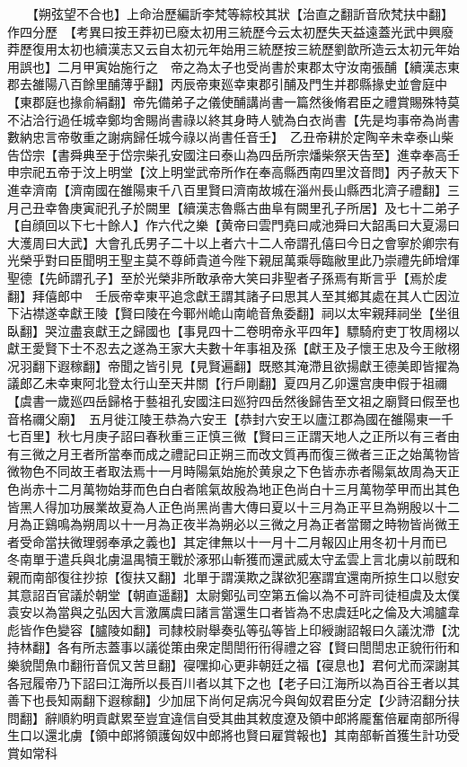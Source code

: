 　　【朔弦望不合也】上命治歷編訢李梵等綜校其狀【治直之翻訢音欣梵扶中翻】作四分歷　【考異曰按王莽初已廢太初用三統歷今云太初歷失天益遠蓋光武中興廢莽歷復用太初也續漢志又云自太初元年始用三統歷按三統歷劉歆所造云太初元年始用誤也】二月甲寅始施行之　帝之為太子也受尚書於東郡太守汝南張酺【續漢志東郡去雒陽八百餘里酺薄乎翻】丙辰帝東廵幸東郡引酺及門生并郡縣掾史並會庭中【東郡庭也掾俞絹翻】帝先備弟子之儀使酺講尚書一篇然後脩君臣之禮賞賜殊特莫不沾洽行過任城幸鄭均舍賜尚書祿以終其身時人號為白衣尚書【先是均事帝為尚書數納忠言帝敬重之謝病歸任城今祿以尚書任音壬】　乙丑帝耕於定陶辛未幸泰山柴告岱宗【書舜典至于岱宗柴孔安國注曰泰山為四岳所宗燔柴祭天告至】進幸奉高壬申宗祀五帝于汶上明堂【汶上明堂武帝所作在奉高縣西南四里汶音問】丙子赦天下進幸濟南【濟南國在雒陽東千八百里賢曰濟南故城在淄州長山縣西北濟子禮翻】三月己丑幸魯庚寅祀孔子於闕里【續漢志魯縣古曲阜有闕里孔子所居】及七十二弟子【自顔回以下七十餘人】作六代之樂【黄帝曰雲門堯曰咸池舜曰大韶禹曰大夏湯曰大濩周曰大武】大會孔氏男子二十以上者六十二人帝謂孔僖曰今日之會寧於卿宗有光榮乎對曰臣聞明王聖主莫不尊師貴道今陛下親屈萬乘辱臨敝里此乃崇禮先師增煇聖德【先師謂孔子】至於光榮非所敢承帝大笑曰非聖者子孫焉有斯言乎【焉於䖍翻】拜僖郎中　壬辰帝幸東平追念獻王謂其諸子曰思其人至其鄉其處在其人亡因泣下沾襟遂幸獻王陵【賢曰陵在今鄆州峗山南峗音魚委翻】祠以太牢親拜祠坐【坐徂臥翻】哭泣盡哀獻王之歸國也【事見四十二卷明帝永平四年】驃騎府吏丁牧周栩以獻王愛賢下士不忍去之遂為王家大夫數十年事祖及孫【獻王及子懷王忠及今王敞栩况羽翻下遐稼翻】帝聞之皆引見【見賢遍翻】既愍其淹滯且欲揚獻王德美即皆擢為議郎乙未幸東阿北登太行山至天井關【行戶剛翻】夏四月乙卯還宫庚申假于祖禰【虞書一歲廵四岳歸格于藝祖孔安國注曰廵狩四岳然後歸告至文祖之廟賢曰假至也音格禰父廟】　五月徙江陵王恭為六安王【恭封六安王以廬江郡為國在雒陽東一千七百里】秋七月庚子詔曰春秋重三正慎三微【賢曰三正謂天地人之正所以有三者由有三微之月王者所當奉而成之禮記曰正朔三而改文質再而復三微者三正之始萬物皆微物色不同故王者取法焉十一月時陽氣始施於黄泉之下色皆赤赤者陽氣故周為天正色尚赤十二月萬物始芽而色白白者隂氣故殷為地正色尚白十三月萬物莩甲而出其色皆黑人得加功展業故夏為人正色尚黑尚書大傳曰夏以十三月為正平旦為朔殷以十二月為正鷄鳴為朔周以十一月為正夜半為朔必以三微之月為正者當爾之時物皆尚微王者受命當扶微理弱奉承之義也】其定律無以十一月十二月報囚止用冬初十月而已　冬南單于遣兵與北虜温禺犢王戰於涿邪山斬獲而還武威太守孟雲上言北虜以前既和親而南部復往抄掠【復扶又翻】北單于謂漢欺之謀欲犯塞謂宜還南所掠生口以慰安其意詔百官議於朝堂【朝直遥翻】太尉鄭弘司空第五倫以為不可許司徒桓虞及太僕袁安以為當與之弘因大言激厲虞曰諸言當還生口者皆為不忠虞廷叱之倫及大鴻臚韋彪皆作色變容【臚陵如翻】司隸校尉舉奏弘等弘等皆上印綬謝詔報曰久議沈滯【沈持林翻】各有所志蓋事以議從策由衆定誾誾衎衎得禮之容【賢曰誾誾忠正貌衎衎和樂貌誾魚巾翻衎音侃又苦旦翻】寑嘿抑心更非朝廷之福【寑息也】君何尤而深謝其各冠履帝乃下詔曰江海所以長百川者以其下之也【老子曰江海所以為百谷王者以其善下也長知兩翻下遐稼翻】少加屈下尚何足病况今與匈奴君臣分定【少詩沼翻分扶問翻】辭順約明貢獻累至豈宜違信自受其曲其敕度遼及領中郎將龎奮倍雇南部所得生口以還北虜【領中郎將領護匈奴中郎將也賢曰雇賞報也】其南部斬首獲生計功受賞如常科


